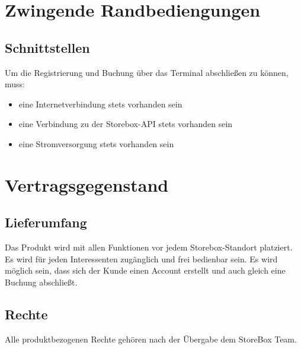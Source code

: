 
\section{Zwingende Randbediengungen}
\subsection{Schnittstellen}
Um die Registrierung und Buchung über das Terminal abschließen zu können, muss:
\begin{itemize}
 \item eine Internetverbindung stets vorhanden sein
 \item eine Verbindung zu der Storebox-API stets vorhanden sein
 \item eine Stromversorgung stets vorhanden sein
 \end{itemize}
\section{Vertragsgegenstand}
\subsection{Lieferumfang}
Das Produkt wird mit allen Funktionen vor jedem Storebox-Standort platziert. Es wird für jeden Interessenten zugänglich und frei bedienbar sein. Es wird möglich sein, dass sich der Kunde einen Account erstellt und auch gleich eine Buchung abschließt.

\subsection{Rechte}
Alle produktbezogenen Rechte gehören nach der Übergabe dem StoreBox Team.